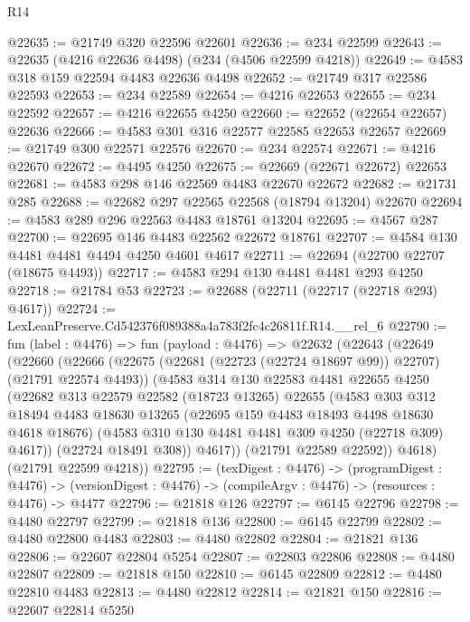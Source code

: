 \begin{lexlean}{R14}
\begin{coremodule}
@22635 := @21749 @320 @22596 @22601
@22636 := @234 @22599
@22643 := @22635 (@4216 @22636 @4498) (@234 (@4506 @22599 @4218))
@22649 := @4583 @318 @159 @22594 @4483 @22636 @4498
@22652 := @21749 @317 @22586 @22593
@22653 := @234 @22589
@22654 := @4216 @22653
@22655 := @234 @22592
@22657 := @4216 @22655 @4250
@22660 := @22652 (@22654 @22657) @22636
@22666 := @4583 @301 @316 @22577 @22585 @22653 @22657
@22669 := @21749 @300 @22571 @22576
@22670 := @234 @22574
@22671 := @4216 @22670
@22672 := @4495 @4250
@22675 := @22669 (@22671 @22672) @22653
@22681 := @4583 @298 @146 @22569 @4483 @22670 @22672
@22682 := @21731 @285
@22688 := @22682 @297 @22565 @22568 (@18794 @13204) @22670
@22694 := @4583 @289 @296 @22563 @4483 @18761 @13204
@22695 := @4567 @287
@22700 := @22695 @146 @4483 @22562 @22672 @18761
@22707 := @4584 @130 @4481 @4481 @4494 @4250 @4601 @4617
@22711 := @22694 (@22700 @22707 (@18675 @4493))
@22717 := @4583 @294 @130 @4481 @4481 @293 @4250
@22718 := @21784 @53
@22723 := @22688 (@22711 (@22717 (@22718 @293) @4617))
@22724 := LexLeanPreserve.Cd542376f089388a4a783f2fc4c26811f.R14.__rel_6
@22790 := fun (label : @4476) =>
  fun (payload : @4476) =>
  @22632
    (@22643
      (@22649
        (@22660
          (@22666
            (@22675 (@22681 (@22723 (@22724 @18697 @99)) @22707) (@21791 @22574 @4493))
            (@4583
              @314
              @130
              @22583
              @4481
              @22655
              @4250
              (@22682
                @313
                @22579
                @22582
                (@18723 @13265)
                @22655
                (@4583
                  @303
                  @312
                  @18494
                  @4483
                  @18630
                  @13265
                  (@22695 @159 @4483 @18493 @4498 @18630 @4618 @18676)
                  (@4583 @310 @130 @4481 @4481 @309 @4250 (@22718 @309) @4617))
                (@22724 @18491 @308))
              @4617))
          (@21791 @22589 @22592))
        @4618)
      (@21791 @22599 @4218))
@22795 := (texDigest : @4476) ->
  (programDigest : @4476) ->
  (versionDigest : @4476) -> (compileArgv : @4476) -> (resources : @4476) -> @4477
@22796 := @21818 @126
@22797 := @6145 @22796
@22798 := @4480 @22797
@22799 := @21818 @136
@22800 := @6145 @22799
@22802 := @4480 @22800 @4483
@22803 := @4480 @22802
@22804 := @21821 @136
@22806 := @22607 @22804 @5254
@22807 := @22803 @22806
@22808 := @4480 @22807
@22809 := @21818 @150
@22810 := @6145 @22809
@22812 := @4480 @22810 @4483
@22813 := @4480 @22812
@22814 := @21821 @150
@22816 := @22607 @22814 @5250

\end{coremodule}
\end{lexlean}

